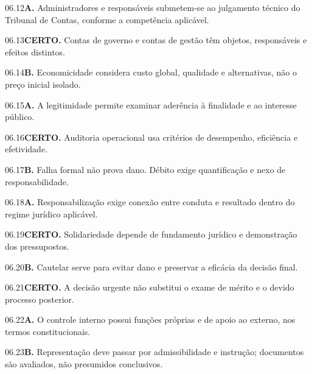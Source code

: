 \begin{solucao}{06.12}\textbf{A.} Administradores e responsáveis submetem-se ao julgamento técnico do Tribunal de Contas, conforme a competência aplicável.\end{solucao}
\begin{solucao}{06.13}\textbf{CERTO.} Contas de governo e contas de gestão têm objetos, responsáveis e efeitos distintos.\end{solucao}
\begin{solucao}{06.14}\textbf{B.} Economicidade considera custo global, qualidade e alternativas, não o preço inicial isolado.\end{solucao}
\begin{solucao}{06.15}\textbf{A.} A legitimidade permite examinar aderência à finalidade e ao interesse público.\end{solucao}
\begin{solucao}{06.16}\textbf{CERTO.} Auditoria operacional usa critérios de desempenho, eficiência e efetividade.\end{solucao}
\begin{solucao}{06.17}\textbf{B.} Falha formal não prova dano. Débito exige quantificação e nexo de responsabilidade.\end{solucao}
\begin{solucao}{06.18}\textbf{A.} Responsabilização exige conexão entre conduta e resultado dentro do regime jurídico aplicável.\end{solucao}
\begin{solucao}{06.19}\textbf{CERTO.} Solidariedade depende de fundamento jurídico e demonstração dos pressupostos.\end{solucao}
\begin{solucao}{06.20}\textbf{B.} Cautelar serve para evitar dano e preservar a eficácia da decisão final.\end{solucao}
\begin{solucao}{06.21}\textbf{CERTO.} A decisão urgente não substitui o exame de mérito e o devido processo posterior.\end{solucao}
\begin{solucao}{06.22}\textbf{A.} O controle interno possui funções próprias e de apoio ao externo, nos termos constitucionais.\end{solucao}
\begin{solucao}{06.23}\textbf{B.} Representação deve passar por admissibilidade e instrução; documentos são avaliados, não presumidos conclusivos.\end{solucao}
